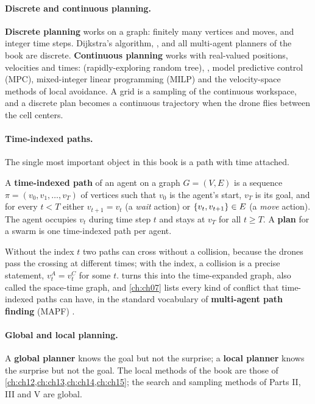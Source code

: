 \paragraph{Discrete and continuous planning.}
\textbf{Discrete planning} works on a graph: finitely many
vertices and moves, and integer time steps. Dijkstra's algorithm, \astar, \dstarlite
and all multi-agent planners of the book are discrete. \textbf{Continuous
planning} works with real-valued positions, velocities and
times: \rrt (rapidly-exploring random tree), \rrtstar, model predictive control (MPC),
mixed-integer linear programming (MILP) and the velocity-space methods of local
avoidance. A
grid is a sampling of the continuous workspace, and a discrete plan becomes a
continuous trajectory when the drone flies between the cell centers.

\paragraph{Time-indexed paths.}
The single most important object in this book is a path with time attached.

\begin{definition}
\label{def:ch01-time-indexed-path}
A \textbf{time-indexed path} of an agent on a graph
$G=(V,E)$ is a sequence $\pi=(v_0,v_1,\dots,v_T)$ of vertices such that $v_0$ is the
agent's start, $v_T$ is its goal, and for every $t<T$ either $v_{t+1}=v_t$ (a
\emph{wait} action) or $\left\{ v_t,v_{t+1} \right\}\in E$ (a \emph{move} action). The agent
occupies $v_t$ during time step $t$ and stays at $v_T$ for all $t\ge T$. A
\textbf{plan} for a swarm is one time-indexed path per agent.
\end{definition}

Without the index $t$ two paths can cross without a collision, because the drones
pass the crossing at different times; with the index, a collision is a precise
statement, $v_t^A=v_t^C$ for some $t$.  turns this into the
time-expanded graph, also called the space-time graph, and \cref{ch:ch07} lists every
kind of conflict that time-indexed paths can have, in the standard vocabulary of
\textbf{multi-agent path finding} (MAPF)
\cite{stern2019mapf}.

\paragraph{Global and local planning.}
A \textbf{global planner} knows the goal but not the surprise;
a \textbf{local planner} knows the surprise but not the goal.
The local methods of the book are those of
\cref{ch:ch12,ch:ch13,ch:ch14,ch:ch15}; the search and sampling methods of Parts II,
III and V are global.

